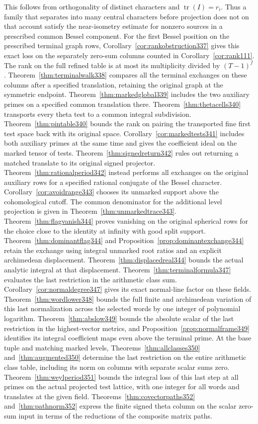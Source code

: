 \documentclass[a4paper,11pt]{article}
\theoremstyle{definition}
\theoremstyle{remark}
\numberwithin{equation}{section}
\begin{document}
This follows from orthogonality of distinct characters and \(\operatorname{tr}(I)=r_i\). Thus a family that separates into many central characters before projection does not on that account satisfy the near-isometry estimate for nonzero sources in a prescribed common Bessel component. For the first Bessel position on the prescribed terminal graph rows, Corollary~\ref{cor:rankobstruction337} gives this exact loss on the separately zero-sum columns counted in Corollary~\ref{cor:rank111}. The rank on the full refined table is at most its multiplicity divided by \((T-1)^f\). Theorem~\ref{thm:terminalwalk338} compares all the terminal exchanges on these columns after a specified translation, retaining the original graph at the symmetric endpoint. Theorem~\ref{thm:markedglobal339} includes the two auxiliary primes on a specified common translation there. Theorem~\ref{thm:thetacells340} transports every theta test to a common integral subdivision. Theorem~\ref{thm:pintable340} bounds the rank on pairing the transported fine first test space back with its original space. Corollary~\ref{cor:markedtests341} includes both auxiliary primes at the same time and gives the coefficient ideal on the marked tensor of tests. Theorem~\ref{thm:signedreturn342} rules out returning a matched translate to its original signed projector. Theorem~\ref{thm:rationalperiod342} instead performs all exchanges on the original auxiliary rows for a specified rational conjugate of the Bessel character. Corollary~\ref{cor:avoidrange343} chooses its unmarked support above the cohomological cutoff. The common denominator for the additional level projection is given in Theorem~\ref{thm:unmarkedtrace343}. Theorem~\ref{thm:flagvanish344} proves vanishing on the original spherical rows for the choice close to the identity at infinity with good split support. Theorem~\ref{thm:dominantflag344} and Proposition~\ref{prop:dominantexchange344} retain the exchange using integral unmarked root ratios and an explicit archimedean displacement. Theorem~\ref{thm:displacedreal344} bounds the actual analytic integral at that displacement. Theorem~\ref{thm:terminalformula347} evaluates the last restriction in the arithmetic class sum. Corollary~\ref{cor:normaldegree347} gives its exact normal-line factor on these fields. Theorem~\ref{thm:wordlower348} bounds the full finite and archimedean variation of this last normalization across the selected words by one integer of polynomial logarithm. Theorem~\ref{thm:abslow349} bounds the absolute scalar of the last restriction in the highest-vector metrics, and Proposition~\ref{prop:normalframe349} identifies its integral coefficient maps even above the terminal prime. At the base tuple and matching marked levels, Theorems~\ref{thm:allclasses350} and~\ref{thm:augmented350} determine the last restriction on the entire arithmetic class table, including its norm on columns with separate scalar sums zero. Theorem~\ref{thm:weylperiod351} bounds the integral loss of this last step at all primes on the actual projected test lattice, with one integer for all words and translates at the given field. Theorems~\ref{thm:covectorpaths352} and~\ref{thm:pathnorm352} express the finite signed theta column on the scalar zero-sum input in terms of the reductions of the composite matrix paths. 
\end{document}
